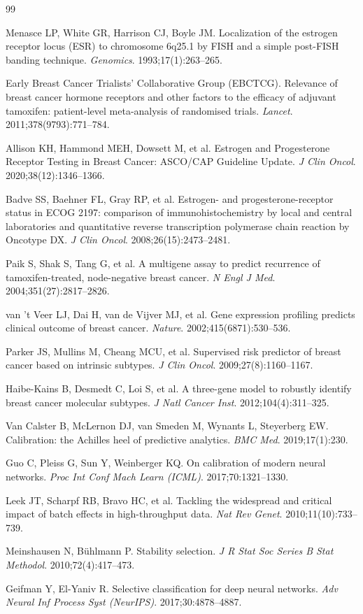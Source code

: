\documentclass[11pt,a4paper]{article}
\begin{document}
\begin{thebibliography}{99}

 Menasce LP, White GR, Harrison CJ, Boyle JM. Localization of the estrogen receptor locus (ESR) to chromosome 6q25.1 by FISH and a simple post-FISH banding technique. \textit{Genomics}. 1993;17(1):263--265.

 Early Breast Cancer Trialists' Collaborative Group (EBCTCG). Relevance of breast cancer hormone receptors and other factors to the efficacy of adjuvant tamoxifen: patient-level meta-analysis of randomised trials. \textit{Lancet}. 2011;378(9793):771--784.

 Allison KH, Hammond MEH, Dowsett M, et al. Estrogen and Progesterone Receptor Testing in Breast Cancer: ASCO/CAP Guideline Update. \textit{J Clin Oncol}. 2020;38(12):1346--1366.

 Badve SS, Baehner FL, Gray RP, et al. Estrogen- and progesterone-receptor status in ECOG 2197: comparison of immunohistochemistry by local and central laboratories and quantitative reverse transcription polymerase chain reaction by Oncotype DX. \textit{J Clin Oncol}. 2008;26(15):2473--2481.

 Paik S, Shak S, Tang G, et al. A multigene assay to predict recurrence of tamoxifen-treated, node-negative breast cancer. \textit{N Engl J Med}. 2004;351(27):2817--2826.

 van 't Veer LJ, Dai H, van de Vijver MJ, et al. Gene expression profiling predicts clinical outcome of breast cancer. \textit{Nature}. 2002;415(6871):530--536.

 Parker JS, Mullins M, Cheang MCU, et al. Supervised risk predictor of breast cancer based on intrinsic subtypes. \textit{J Clin Oncol}. 2009;27(8):1160--1167.

 Haibe-Kains B, Desmedt C, Loi S, et al. A three-gene model to robustly identify breast cancer molecular subtypes. \textit{J Natl Cancer Inst}. 2012;104(4):311--325.

 Van Calster B, McLernon DJ, van Smeden M, Wynants L, Steyerberg EW. Calibration: the Achilles heel of predictive analytics. \textit{BMC Med}. 2019;17(1):230.

 Guo C, Pleiss G, Sun Y, Weinberger KQ. On calibration of modern neural networks. \textit{Proc Int Conf Mach Learn (ICML)}. 2017;70:1321--1330.

 Leek JT, Scharpf RB, Bravo HC, et al. Tackling the widespread and critical impact of batch effects in high-throughput data. \textit{Nat Rev Genet}. 2010;11(10):733--739.

 Meinshausen N, B\"uhlmann P. Stability selection. \textit{J R Stat Soc Series B Stat Methodol}. 2010;72(4):417--473.

 Geifman Y, El-Yaniv R. Selective classification for deep neural networks. \textit{Adv Neural Inf Process Syst (NeurIPS)}. 2017;30:4878--4887.

\end{thebibliography}
\end{document}
